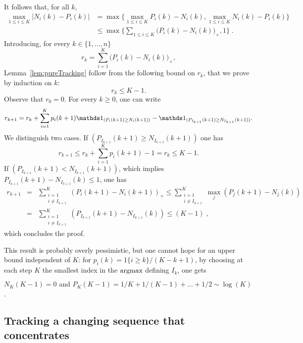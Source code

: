 \documentclass{colt2016} %
\begin{document}
It follows that, for all $k$,  
	\begin{align*}\max_{1\leq i\leq K} \big|N_i(k)-P_i(k)\big| & = \max\big\{ \max_{1\leq i\leq K} P_i(k)-N_i(k) , \max_{1\leq i\leq K} N_i(k)-P_i(k) \big\}\\
	& \leq \max\{ \sum_{1\leq i\leq K}\big(P_i(k)-N_i(k) \big)_+  , 1 \}\;.
	\end{align*}
Introducing, for every $k\in\{1,\dots,n\}$
\[r_k = \sum_{i=1}^K\big(P_i(k)-N_i(k) \big)_+,\]
Lemma~\ref{lem:pureTracking} follow from the following bound on $r_k$, that we prove by induction on $k$:
\[r_k \leq K-1.\]
Observe that $r_0=0$. For every $k\geq 0$, one can write
\[r_{k+1} = r_k + \sum_{i = 1}^K  p_{i}(k+1)\ind_{(P_{i}(k+1) \geq N_{i}(k+1))} - \ind_{(P_{I_{k+1}}(k+1) \geq N_{I_{k+1}}(k+1))}.\]
We distinguish two cases. If $(P_{I_{k+1}}(k+1) \geq N_{I_{k+1}}(k+1))$ one has \[r_{k+1} \leq r_k +  \sum_{i=1}^K  p_{i}(k+1) - 1 = r_k \leq K-1.\] If $(P_{I_{k+1}}(k+1) < N_{I_{k+1}}(k+1))$, which implies $P_{I_{k+1}}(k+1) - N_{I_{k+1}}(k) \leq 1$, one has
\begin{eqnarray*}
r_{k+1} &=& \sum_{\substack{i =1  \\i \neq I_{k+1} }}^K (P_{i}(k+1) - N_{i}(k+1))_+ \leq \sum_{\substack{i =1  \\i \neq I_{k+1} }}^K \max_j \left(P_{j}(k+1) - N_{j}(k)\right)\\
&{=} & \sum_{\substack{i =1  \\i \neq I_{k+1} }}^K \left(P_{I_{k+1}}(k+1) - N_{I_{k+1}}(k)\right) \leq (K-1)\;,
\end{eqnarray*}
which concludes the proof.

\begin{remark} This result is probably overly pessimistic, but one cannot hope for an upper bound independent of $K$: for $p_i(k) = 1\{i\geq k\}/(K-k+1)$, by choosing at each step $K$ the smallest index in the $\underset{}{\text{argmax}}$ defining $I_k$, one gets $N_{K}(K-1)=0$ and $P_{K}(K-1)=1/K+1/(K-1)+...+1/2\sim \log(K)$.
\end{remark}


\subsection{Tracking a changing sequence that concentrates}
\end{document}
